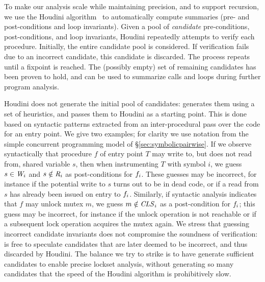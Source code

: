 To make our analysis scale while maintaining precision, and to support recursion, we use the Houdini algorithm~\cite{flanagan2001houdini} to automatically compute summaries (pre- and post-conditions and loop invariants).  Given a pool of \emph{candidate} pre-conditions, post-conditions, and loop invariants, Houdini repeatedly attempts to verify each procedure.  Initially, the entire candidate pool is considered.  If verification fails due to an incorrect candidate, this candidate is discarded.  The process repeats until a fixpoint is reached.  The (possibly empty) set of remaining candidates has been proven to hold, and can be used to summarize calls and loops during further program analysis.

Houdini does not generate the initial pool of candidates: \whoop generates them using a set of heuristics, and passes them to Houdini as a starting point.  This is done based on syntactic patterns extracted from an inter-procedural pass over the code for an entry point.  We give two examples; for clarity we use notation from the simple concurrent programming model of \S\ref{sec:symbolicpairwise}.  If we observe syntactically that procedure $f$ of entry point $T$ may write to, but does not read from, shared variable $s$, then when instrumenting $T$ with symbol $i$, we guess $s \in \mathit{W}_{i}$ and $s \notin\mathit{R}_{i}$ as post-conditions for $f_{i}$.  These guesses may be incorrect, for instance if the potential write to $s$ turns out to be in dead code, or if a read from $s$ has already been issued on entry to $f_{i}$.  Similarly, if syntactic analysis indicates that $f$ may unlock mutex $m$, we guess $m \notin \mathit{CLS}_{i}$ as a post-condition for $f_{i}$; this guess may be incorrect, for instance if the unlock operation is not reachable or if a subsequent lock operation acquires the mutex again.  We stress that guessing incorrect candidate invariants does not compromise the soundness of verification: \whoop is free to speculate candidates that are later deemed to be incorrect, and thus discarded by Houdini.  The balance we try to strike is to have \whoop generate sufficient candidates to enable precise lockset analysis, without generating so many candidates that the speed of the Houdini algorithm is prohibitively slow.



